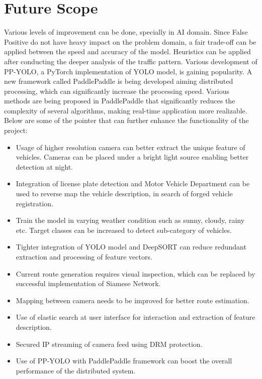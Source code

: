 \section{Future Scope}
Various levels of improvement can be done, specially in AI domain. Since False Positive do not have heavy impact on the problem domain, a fair trade-off can be applied between the speed and accuracy of the model. Heuristics can be applied after conducting the deeper analysis of the traffic pattern. Various development of PP-YOLO, a PyTorch implementation of YOLO model, is gaining popularity. A new framework called PaddlePaddle \cite{paddlepaddle} is being developed aiming distributed processing, which can significantly increase the processing speed. Various methods are being proposed in PaddlePaddle that significantly reduces the complexity of several algorithms, making real-time application more realizable. Below are some of the pointer that can further enhance the functionality of the project:
\begin{itemize}
	\item Usage of higher resolution camera can better extract the unique feature of vehicles. Cameras can be placed under a bright light source enabling better detection at night.
	\item Integration of license plate detection and Motor Vehicle Department can be used to reverse map the vehicle description, in search of forged vehicle registration.
	\item Train the model in varying weather condition such as sunny, cloudy, rainy etc. Target classes can be increased to detect sub-category of vehicles.
	\item Tighter integration of YOLO model and DeepSORT can reduce redundant extraction and processing of feature vectors.
	\item Current route generation requires visual inspection, which can be replaced by successful implementation of Siamese Network.
	\item Mapping between camera needs to be improved for better route estimation.
	\item Use of elastic search at user interface for interaction and extraction of feature description.
	\item Secured IP streaming of camera feed using DRM protection.
	\item Use of PP-YOLO with PaddlePaddle framework can boost the overall performance of the distributed system.
\end{itemize}